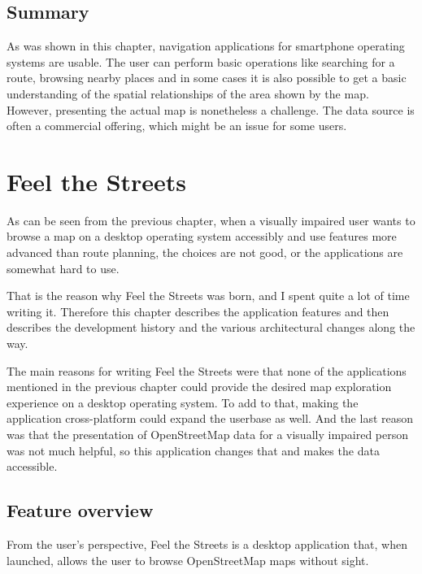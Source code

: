 \documentclass[nolof,digital]{fithesis3}
\begin{document}
\section{Summary}
As was shown in this chapter, navigation applications for smartphone operating systems are usable. The user can perform basic operations like searching for a route, browsing nearby places and in some cases it is also possible to get a basic understanding of the spatial relationships of the area shown by the map. However, presenting the actual map is nonetheless a challenge. The data source is often a commercial offering, which might be an issue for some users.
\chapter{Feel the Streets} \label{ref:fts}
As can be seen from the previous chapter, when a visually impaired user wants to browse a map on a desktop operating system accessibly and use features more advanced than route planning, the choices are not good, or the applications are somewhat hard to use.

That is the reason why Feel the Streets was born, and I spent quite a lot of time writing it. Therefore this chapter describes the application features and then describes the development history and the various architectural changes along the way.

The main reasons for writing Feel the Streets were that none of the applications mentioned in the previous chapter could provide the desired map exploration experience on a desktop operating system. To add to that, making the application cross-platform could expand the userbase as well. And the last reason was that the presentation of OpenStreetMap data for a visually impaired person was not much helpful, so this application changes that and makes the data accessible.
\section{Feature overview}
From the user's perspective, Feel the Streets is a desktop application that, when launched, allows the user to browse OpenStreetMap maps without sight.
\end{document}
